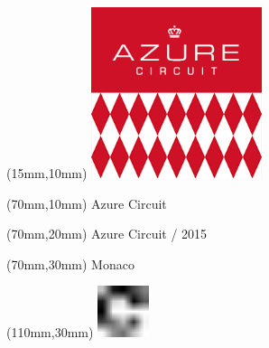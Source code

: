 \null\newpage
\begin{textblock*}{50mm}(15mm,10mm)%
\includegraphics[width=50mm]{LG/AZI.png}
\end{textblock*}
\begin{textblock*}{130mm}(70mm,10mm)%
{\fontsize{20}{20}\selectfont Azure Circuit}\\
\end{textblock*}
\begin{textblock*}{120mm}(70mm,20mm)%
{\fontsize{16}{16}\selectfont Azure Circuit / 2015}\\
\end{textblock*}
\begin{textblock*}{120mm}(70mm,30mm)%
{\fontsize{12}{12}\selectfont Monaco}
\end{textblock*}
\begin{textblock*}{30mm}(110mm,30mm)%
\centering
\includegraphics[height=15mm]{icons/fa-rotate-right.pdf}
\end{textblock*}
